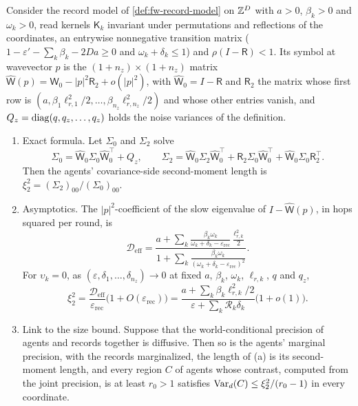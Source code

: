 \begin{proposition}\label{prop:sca-records-length}
Consider the record model of \cref{def:fw-record-model} on $\mathbb{Z}^D$ with $a>0$, $\beta_k>0$ and $\omega_k>0$, read kernels $\mathsf K_k$ invariant under permutations and reflections of the coordinates, an entrywise nonnegative transition matrix ($1-\varepsilon'-\sum_k\beta_k-2Da\ge0$ and $\omega_k+\delta_k\le1$) and $\rho(I-\mathsf R)<1$. Its symbol at wavevector $p$ is the $(1+n_z)\times(1+n_z)$ matrix $\hat{\mathsf W}(p)=\hat{\mathsf W}_0-|p|^2\mathsf R_2+o(|p|^2)$, with $\hat{\mathsf W}_0=I-\mathsf R$ and $\mathsf R_2$ the matrix whose first row is $(a,\beta_1\ell_{r,1}^2/2,\dots,\beta_{n_z}\ell_{r,n_z}^2/2)$ and whose other entries vanish, and $Q_z=\operatorname{diag}(q,q_z,\dots,q_z)$ holds the noise variances of the definition.
\begin{enumerate}
\item[(a)] Exact formula. Let $\Sigma_0$ and $\Sigma_2$ solve
\begin{equation}\label{eq:sca-records-lyap}
\Sigma_0=\hat{\mathsf W}_0\Sigma_0\hat{\mathsf W}_0^\top+Q_z,\qquad\Sigma_2=\hat{\mathsf W}_0\Sigma_2\hat{\mathsf W}_0^\top+\mathsf R_2\Sigma_0\hat{\mathsf W}_0^\top+\hat{\mathsf W}_0\Sigma_0\mathsf R_2^\top.
\end{equation}
Then the agents' covariance-side second-moment length is $\xi_2^2=(\Sigma_2)_{00}/(\Sigma_0)_{00}$.
\item[(b)] Asymptotics. The $|p|^2$-coefficient of the slow eigenvalue of $I-\hat{\mathsf W}(p)$, in hops squared per round, is
\begin{equation}\label{eq:sca-deff}
\mathcal D_{\mathrm{eff}}=\frac{a+\sum_k\frac{\beta_k\omega_k}{\omega_k+\delta_k-\varepsilon_{\mathrm{rec}}}\frac{\ell_{r,k}^2}{2}}{1+\sum_k\frac{\beta_k\omega_k}{(\omega_k+\delta_k-\varepsilon_{\mathrm{rec}})^2}}.
\end{equation}
For $\upsilon_k=0$, as $(\varepsilon,\delta_1,\dots,\delta_{n_z})\to0$ at fixed $a$, $\beta_k$, $\omega_k$, $\ell_{r,k}$, $q$ and $q_z$,
\begin{equation}\label{eq:sca-records-xi}
\xi_2^2=\frac{\mathcal D_{\mathrm{eff}}}{\varepsilon_{\mathrm{rec}}}\bigl(1+O(\varepsilon_{\mathrm{rec}})\bigr)=\frac{a+\sum_k\beta_k\ell_{r,k}^2/2}{\varepsilon+\sum_k\mathcal R_k\delta_k}\bigl(1+o(1)\bigr).
\end{equation}
\item[(c)] Link to the size bound. Suppose that the world-conditional precision of agents and records together is diffusive. Then so is the agents' marginal precision, with the records marginalized, the length of (a) is its second-moment length, and every region $C$ of agents whose contrast, computed from the joint precision, is at least $r_0>1$ satisfies $\operatorname{Var}_d(C)\le\xi_2^2/(r_0-1)$ in every coordinate.
\end{enumerate}
\end{proposition}
